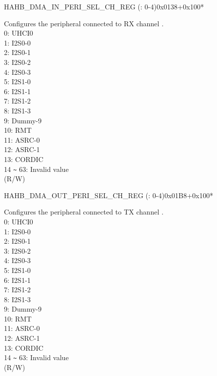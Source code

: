\begin{register}{H}{AHB\_DMA\_IN\_PERI\_SEL\_CH\_REG (: 0-4)}{0x0138+0x100*}\label{regdesc:AHBDMAINPERISELCHNREG}
%
%
\regnewline%
\begin{regdesc}\begin{reglist}
\label{fielddesc:AHBDMAPERIINSELCHN}\item [AHB\_DMA\_PERI\_IN\_SEL\_CH\regindex{n}] Configures the peripheral connected to RX channel .\\ 0: UHCI0\\ 1: I2S0-0\\ 2: I2S0-1\\ 3: I2S0-2\\ 4: I2S0-3\\ 5: I2S1-0\\ 6: I2S1-1\\ 7: I2S1-2\\ 8: I2S1-3\\ 9: Dummy-9\\ 10: RMT\\ 11: ASRC-0\\ 12: ASRC-1 \\ 13: CORDIC \\ 14 \verb+~+ 63: Invalid value\\ (R/W)
\end{reglist}\end{regdesc}
\end{register}


\begin{register}{H}{AHB\_DMA\_OUT\_PERI\_SEL\_CH\_REG (: 0-4)}{0x01B8+0x100*}\label{regdesc:AHBDMAOUTPERISELCHNREG}
%
%
\regnewline%
\begin{regdesc}\begin{reglist}
\label{fielddesc:AHBDMAPERIOUTSELCHN}\item [AHB\_DMA\_PERI\_OUT\_SEL\_CH\regindex{n}] Configures the peripheral connected to TX channel .\\ 0: UHCI0\\ 1: I2S0-0\\ 2: I2S0-1\\ 3: I2S0-2\\ 4: I2S0-3\\ 5: I2S1-0\\ 6: I2S1-1\\ 7: I2S1-2\\ 8: I2S1-3\\ 9: Dummy-9\\ 10: RMT\\ 11: ASRC-0\\ 12: ASRC-1 \\ 13: CORDIC \\ 14 \verb+~+ 63: Invalid value\\ (R/W)
\end{reglist}\end{regdesc}
\end{register}
